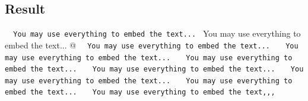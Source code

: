 \documentclass{generic}
\begin{document}

\endverbatim


\subsection{Result}
\verb"  You may use everything to embed the text... "
\verb@  You may use everything to embed the text... @
\verb<  You may use everything to embed the text... <
\verb'  You may use everything to embed the text... '
\verb+  You may use everything to embed the text... +
\verb=  You may use everything to embed the text... =
\verb|  You may use everything to embed the text... |
\verb?  You may use everything to embed the text... ?
\verb.  You may use everything to embed the text,,, .

%

\end{document}
